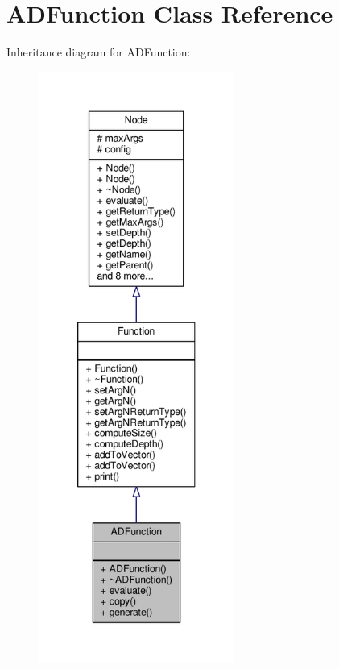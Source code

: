 \hypertarget{classADFunction}{}\section{A\+D\+Function Class Reference}
\label{classADFunction}


Inheritance diagram for A\+D\+Function\+:
\nopagebreak
\begin{figure}[H]
\begin{center}
\leavevmode
\includegraphics[height=550pt]{classADFunction__inherit__graph}
\end{center}
\end{figure}


